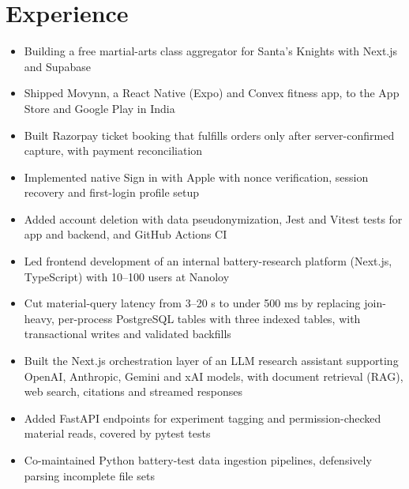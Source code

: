 \section{Experience}
\begin{itemize}
  \item Building a free martial-arts class aggregator for Santa's Knights with Next.js and Supabase
\end{itemize}
\begin{itemize}
  \item Shipped Movynn, a React Native (Expo) and Convex fitness app, to the App Store and Google Play in India
  \item Built Razorpay ticket booking that fulfills orders only after server-confirmed capture, with payment reconciliation
  \item Implemented native Sign in with Apple with nonce verification, session recovery and first-login profile setup
  \item Added account deletion with data pseudonymization, Jest and Vitest tests for app and backend, and GitHub Actions CI
\end{itemize}
\begin{itemize}
  \item Led frontend development of an internal battery-research platform (Next.js, TypeScript) with 10--100 users at Nanoloy
  \item Cut material-query latency from 3--20 s to under 500 ms by replacing join-heavy, per-process PostgreSQL tables with three indexed tables, with transactional writes and validated backfills
  \item Built the Next.js orchestration layer of an LLM research assistant supporting OpenAI, Anthropic, Gemini and xAI models, with document retrieval (RAG), web search, citations and streamed responses
  \item Added FastAPI endpoints for experiment tagging and permission-checked material reads, covered by pytest tests
  \item Co-maintained Python battery-test data ingestion pipelines, defensively parsing incomplete file sets
\end{itemize}
